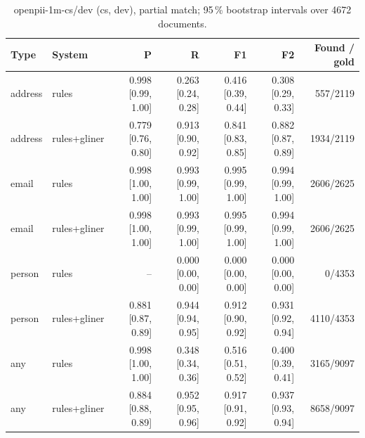\providecommand{\ci}[2]{{\scriptsize [#1, #2]}}

\begin{table}[htbp]
\centering
\small
\begin{tabular}{llrrrrr}
\toprule
Type & System & P & R & F1 & F2 & Found / gold \\
\midrule
address & rules & 0.998 \ci{0.99}{1.00} & 0.263 \ci{0.24}{0.28} & 0.416 \ci{0.39}{0.44} & 0.308 \ci{0.29}{0.33} & 557/2119 \\
address & rules+gliner & 0.779 \ci{0.76}{0.80} & 0.913 \ci{0.90}{0.92} & 0.841 \ci{0.83}{0.85} & 0.882 \ci{0.87}{0.89} & 1934/2119 \\
email & rules & 0.998 \ci{1.00}{1.00} & 0.993 \ci{0.99}{1.00} & 0.995 \ci{0.99}{1.00} & 0.994 \ci{0.99}{1.00} & 2606/2625 \\
email & rules+gliner & 0.998 \ci{1.00}{1.00} & 0.993 \ci{0.99}{1.00} & 0.995 \ci{0.99}{1.00} & 0.994 \ci{0.99}{1.00} & 2606/2625 \\
person & rules & -- & 0.000 \ci{0.00}{0.00} & 0.000 \ci{0.00}{0.00} & 0.000 \ci{0.00}{0.00} & 0/4353 \\
person & rules+gliner & 0.881 \ci{0.87}{0.89} & 0.944 \ci{0.94}{0.95} & 0.912 \ci{0.90}{0.92} & 0.931 \ci{0.92}{0.94} & 4110/4353 \\
any & rules & 0.998 \ci{1.00}{1.00} & 0.348 \ci{0.34}{0.36} & 0.516 \ci{0.51}{0.52} & 0.400 \ci{0.39}{0.41} & 3165/9097 \\
any & rules+gliner & 0.884 \ci{0.88}{0.89} & 0.952 \ci{0.95}{0.96} & 0.917 \ci{0.91}{0.92} & 0.937 \ci{0.93}{0.94} & 8658/9097 \\
\bottomrule
\end{tabular}
\caption{openpii-1m-cs/dev (cs, dev), partial match; 95\,\% bootstrap intervals over 4672 documents.}
\label{tab:openpii-dev-openpii-1m-cs-dev-partial}
\end{table}

